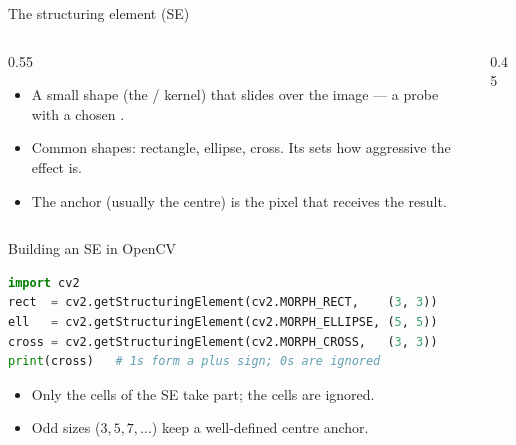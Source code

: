 \documentclass[10pt,aspectratio=169]{beamer}
\begin{document}
\begin{frame}{The structuring element (SE)}
  \begin{columns}[T]
    \begin{column}{0.55\textwidth}
      \begin{itemize}
        \item A small shape (the  / kernel) that slides over the image — a probe with a chosen .
        \item Common shapes: rectangle, ellipse, cross. Its  sets how aggressive the effect is.
        \item The anchor (usually the centre) is the pixel that receives the result.
      \end{itemize}
    \end{column}
    \begin{column}{0.45\textwidth}
      \begin{center}
      \end{center}
    \end{column}
  \end{columns}
\end{frame}

\begin{frame}[fragile]{Building an SE in OpenCV}
\begin{lstlisting}[language=Python]
import cv2
rect  = cv2.getStructuringElement(cv2.MORPH_RECT,    (3, 3))
ell   = cv2.getStructuringElement(cv2.MORPH_ELLIPSE, (5, 5))
cross = cv2.getStructuringElement(cv2.MORPH_CROSS,   (3, 3))
print(cross)   # 1s form a plus sign; 0s are ignored
\end{lstlisting}
  \begin{itemize}
    \item Only the  cells of the SE take part; the  cells are ignored.
    \item Odd sizes ($3,5,7,\dots$) keep a well-defined centre anchor.
  \end{itemize}
\end{frame}

\end{document}

